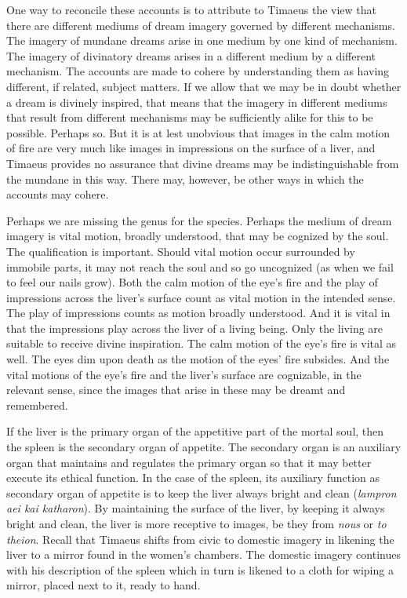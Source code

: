 One way to reconcile these accounts is to attribute to Timaeus the view that there are different mediums of dream imagery governed by different mechanisms. The imagery of mundane dreams arise in one medium by one kind of mechanism. The imagery of divinatory dreams arises in a different medium by a different mechanism. The accounts are made to cohere by understanding them as having different, if related, subject matters. If we allow that we may be in doubt whether a dream is divinely inspired, that means that the imagery in different mediums that result from different mechanisms may be sufficiently alike for this to be possible. Perhaps so. But it is at lest unobvious that images in the calm motion of fire are very much like images in impressions on the surface of a liver, and Timaeus provides no assurance that divine dreams may be indistinguishable from the mundane in this way. There may, however, be other ways in which the accounts may cohere. 

Perhaps we are missing the genus for the species. Perhaps the medium of dream imagery is vital motion, broadly understood, that may be cognized by the soul. The qualification is important. Should vital motion occur surrounded by immobile parts, it may not reach the soul and so go uncognized (as when we fail to feel our nails grow). Both the calm motion of the eye's fire and the play of impressions across the liver's surface count as vital motion in the intended sense. The play of impressions counts as motion broadly understood. And it is vital in that the impressions play across the liver of a living being. Only the living are suitable to receive divine inspiration. The calm motion of the eye's fire is vital as well. The eyes dim upon death as the motion of the eyes' fire subsides. And the vital motions of the eye's fire and the liver's surface are cognizable, in the relevant sense, since the images that arise in these may be dreamt and remembered.

If the liver is the primary organ of the appetitive part of the mortal soul, then the spleen is the secondary organ of appetite. The secondary organ is an auxiliary organ that maintains and regulates the primary organ so that it may better execute its ethical function. In the case of the spleen, its auxiliary function as secondary organ of appetite is to keep the liver always bright and clean (\emph{lampron aei kai katharon}). By maintaining the surface of the liver, by keeping it always bright and clean, the liver is more receptive to images, be they from \emph{nous} or \emph{to theion}. Recall that Timaeus shifts from civic to domestic imagery in likening the liver to a mirror found in the women's chambers. The domestic imagery continues with his description of the spleen which in turn is likened to a cloth for wiping a mirror, placed next to it, ready to hand.

